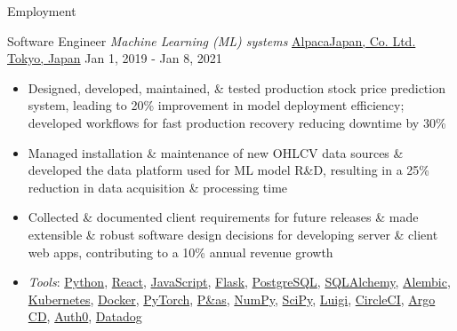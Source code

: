 \documentclass[]{mcdowellcv}
\begin{document}
\begin{cvsection}{Employment}
  \begin{cvsubsection}
    {Software Engineer \linebreak \textit{Machine Learning (ML) systems}}
    {\href{https://www.alpaca.markets/jp/about.html}{AlpacaJapan, Co. Ltd. \linebreak Tokyo, Japan}}
    {Jan 1, 2019 - Jan 8, 2021}
    \begin{itemize}
      \item
            Designed, developed, maintained, \& tested production stock price
            prediction system, leading to 20\% improvement in model deployment
            efficiency; developed workflows for fast production recovery
            reducing downtime by 30\%
      \item
            Managed installation \& maintenance of new OHLCV data sources \&
            developed the data platform used for ML model R\&D, resulting in
            a 25\% reduction in data acquisition \& processing time
      \item
            Collected \& documented client requirements for future releases \&
            made extensible \& robust software design decisions for developing
            server \& client web apps, contributing to a 10\% annual revenue
            growth
      \item
            \textit{Tools}:
            \href{https://www.python.org/}{Python},
            \href{https://react.dev/}{React},
            \href{https://developer.mozilla.org/en-US/docs/Web/JavaScript}{JavaScript},
            \href{https://flask.palletsprojects.com/}{Flask},
            \href{https://www.postgresql.org/}{PostgreSQL},
            \href{https://www.sqlalchemy.org/}{SQLAlchemy},
            \href{https://alembic.sqlalchemy.org/en/latest/}{Alembic},
            \href{https://kubernetes.io/}{Kubernetes},
            \href{https://www.docker.com/}{Docker},
            \href{https://pytorch.org/}{PyTorch},
            \href{https://p\&as.pydata.org/}{P\&as},
            \href{https://numpy.org/}{NumPy}, \href{https://scipy.org/}{SciPy},
            \href{https://github.com/spotify/luigi}{Luigi},
            \href{https://circleci.com/}{CircleCI},
            \href{https://argoproj.github.io/cd/}{Argo CD},
            \href{https://auth0.com/}{Auth0},
            \href{https://www.datadoghq.com/}{Datadog}
    \end{itemize}
  \end{cvsubsection}


\end{cvsection}
\end{document}
